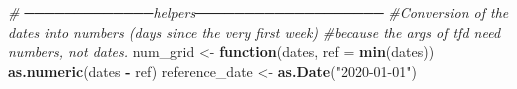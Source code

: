\documentclass[
]{article}
\newenvironment{Shaded}{\begin{snugshade}}{\end{snugshade}}
\newcommand{\AttributeTok}[1]{\textcolor[rgb]{0.13,0.29,0.53}{#1}}
\newcommand{\CommentTok}[1]{\textcolor[rgb]{0.56,0.35,0.01}{\textit{#1}}}
\newcommand{\ControlFlowTok}[1]{\textcolor[rgb]{0.13,0.29,0.53}{\textbf{#1}}}
\newcommand{\FunctionTok}[1]{\textcolor[rgb]{0.13,0.29,0.53}{\textbf{#1}}}
\newcommand{\NormalTok}[1]{#1}
\newcommand{\OtherTok}[1]{\textcolor[rgb]{0.56,0.35,0.01}{#1}}
\newcommand{\SpecialCharTok}[1]{\textcolor[rgb]{0.81,0.36,0.00}{\textbf{#1}}}
\newcommand{\StringTok}[1]{\textcolor[rgb]{0.31,0.60,0.02}{#1}}
\begin{document}
\begin{Shaded}
\begin{Highlighting}[]
\CommentTok{\# ─────────────helpers───────────────────}
\CommentTok{\#Conversion of the dates into  numbers (days since the very first week)}
\CommentTok{\#because the args of tfd  need numbers, not dates.}
\NormalTok{num\_grid }\OtherTok{\textless{}{-}} \ControlFlowTok{function}\NormalTok{(dates, }\AttributeTok{ref =} \FunctionTok{min}\NormalTok{(dates)) }\FunctionTok{as.numeric}\NormalTok{(dates }\SpecialCharTok{{-}}\NormalTok{ ref)}
\NormalTok{reference\_date }\OtherTok{\textless{}{-}} \FunctionTok{as.Date}\NormalTok{(}\StringTok{"2020{-}01{-}01"}\NormalTok{)}
\end{Highlighting}
\end{Shaded}

\begin{Shaded}
\end{Shaded}
\end{document}
